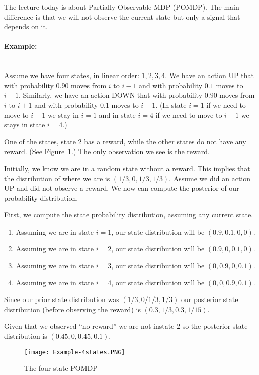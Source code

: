 
The lecture today is about Partially Observable MDP (POMDP). The
main difference is that we will not observe the current state but
only a signal that depends on it.


\paragraph{Example:}\ \\
Assume we have four states, in linear order: $1,2,3,4$. We have an
action UP that with probability $0.90$ moves from $i$ to $i-1$ and
with probability $0.1$ moves to $i+1$. Similarly, we have an action
DOWN that with probability $0.90$ moves from $i$ to $i+1$ and with
probability $0.1$ moves to $i-1$. (In state $i=1$ if we need to move
to $i-1$ we stay in $i=1$ and in state $i=4$ if we need to move to
$i+1$ we stays in state $i=4$.)

One of the states, state $2$ has a reward, while the other states do
not have any reward. (See Figure~\ref{fig:Example-4states}.) The
only observation we see is the reward.

Initially, we know we are in a random state without a reward. This
implies that the distribution of where we are is $(1/3,0,1/3,1/3)$.
Assume we did an action UP and did not observe a reward. We now can
compute the posterior of our probability distribution.

First, we compute the state probability distribution, assuming any
current state.
\begin{enumerate}
\item
Assuming we are in state $i=1$, our state distribution will be
$(0.9,0.1,0,0)$.
\item
Assuming we are in state $i=2$, our state distribution will be
$(0.9,0,0.1,0)$.
\item
Assuming we are in state $i=3$, our state distribution will be
$(0,0.9,0,0.1)$.
\item
Assuming we are in state $i=4$, our state distribution will be
$(0,0,0.9,0.1)$.
\end{enumerate}

Since our prior state distribution was $(1/3,0/1/3,1/3)$ our
posterior state distribution (before observing the reward) is
$(0.3,1/3,0.3,1/15)$.

Given that we observed ``no reward'' we are not instate $2$ so the
posterior state distribution is $(0.45,0,0.45,0.1)$.


\begin{figure}
  \begin{centering}
  \texttt{[image: Example-4states.PNG]}\\
  \caption{The four state POMDP}\label{fig:Example-4states}
  \end{centering}
\end{figure}


